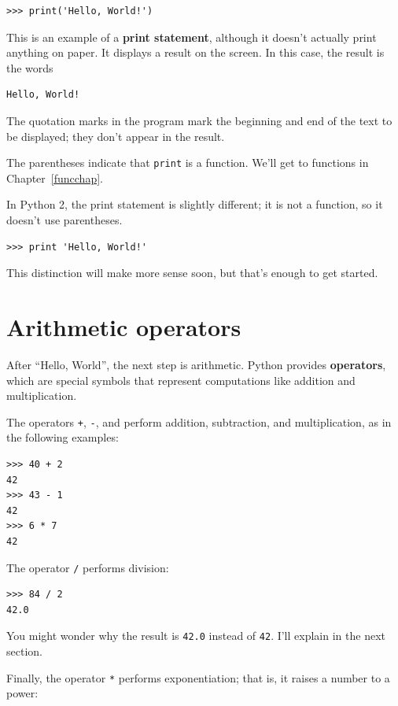 \documentclass[10pt]{book}
\begin{document}
\begin{verbatim}
>>> print('Hello, World!')
\end{verbatim}
%
This is an example of a {\bf print statement}, although it
doesn't actually print anything on paper.  It displays a result on the
screen.  In this case, the result is the words

\begin{verbatim}
Hello, World!
\end{verbatim}
%
The quotation marks in the program mark the beginning and end
of the text to be displayed; they don't appear in the result.

The parentheses indicate that {\tt print} is a function.  We'll get
to functions in Chapter~\ref{funcchap}.
 

In Python 2, the print statement is slightly different; it is not
a function, so it doesn't use parentheses.

\begin{verbatim}
>>> print 'Hello, World!'
\end{verbatim}
%
This distinction will make more sense soon, but that's enough to
get started.


\section{Arithmetic operators}

After ``Hello, World'', the next step is arithmetic.  Python provides
{\bf operators}, which are special symbols that represent computations
like addition and multiplication.  

The operators {\tt +}, {\tt -}, and {\tt *} perform addition,
subtraction, and multiplication, as in the following examples:

\begin{verbatim}
>>> 40 + 2
42
>>> 43 - 1
42
>>> 6 * 7
42
\end{verbatim}
%
The operator {\tt /} performs division:

\begin{verbatim}
>>> 84 / 2
42.0
\end{verbatim}
%
You might wonder why the result is {\tt 42.0} instead of {\tt 42}.
I'll explain in the next section.

Finally, the operator {\tt **} performs exponentiation; that is,
it raises a number to a power:
\end{document}
